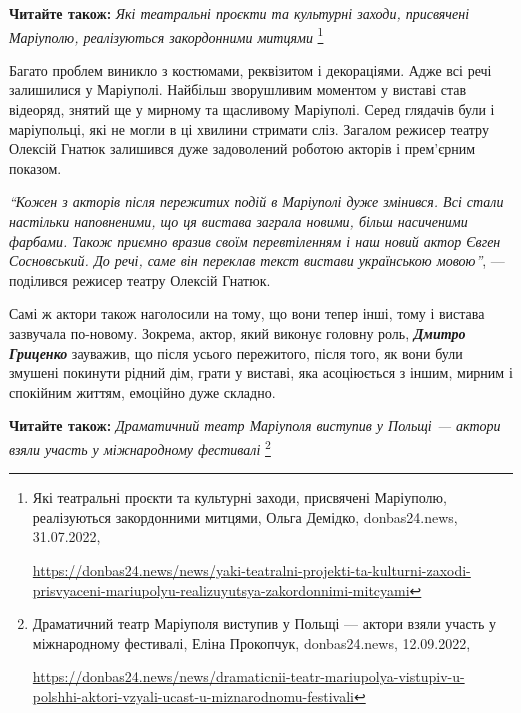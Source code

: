 \textbf{Читайте також:} \emph{Які театральні проєкти та культурні заходи, присвячені Маріуполю, реалізуються закордонними митцями}%
\footnote{Які театральні проєкти та культурні заходи, присвячені Маріуполю, реалізуються закордонними митцями, %
Ольга Демідко, donbas24.news, 31.07.2022, \par\url{https://donbas24.news/news/yaki-teatralni-projekti-ta-kulturni-zaxodi-prisvyaceni-mariupolyu-realizuyutsya-zakordonnimi-mitcyami}%
}


Багато проблем виникло з костюмами, реквізитом і декораціями. Адже всі речі
залишилися у Маріуполі. Найбільш зворушливим моментом у виставі став відеоряд,
знятий ще у мирному та щасливому Маріуполі. Серед глядачів були і маріупольці,
які не могли в ці хвилини стримати сліз. Загалом режисер театру Олексій Гнатюк
залишився дуже задоволений роботою акторів і прем'єрним показом. 

\begin{leftbar}
  \begingroup
\emph{\enquote{Кожен з акторів після пережитих подій в Маріуполі дуже змінився. Всі стали
настільки наповненими, що ця вистава заграла новими, більш насиченими
фарбами. Також приємно вразив своїм перевтіленням і наш новий актор
Євген Сосновський. До речі, саме він переклав текст вистави українською
мовою}}, — поділився режисер театру Олексій Гнатюк. 
   \endgroup
\end{leftbar}

Самі ж актори також наголосили на тому, що вони тепер інші, тому і вистава
зазвучала по-новому. Зокрема, актор, який виконує головну роль, \textbf{\emph{Дмитро Гриценко}}
зауважив, що після усього пережитого, після того, як вони були змушені покинути
рідний дім, грати у виставі, яка асоціюється з іншим, мирним і спокійним
життям, емоційно дуже складно.

\textbf{Читайте також:} \emph{Драматичний театр Маріуполя виступив у Польщі — актори взяли участь у міжнародному фестивалі}%
\footnote{Драматичний театр Маріуполя виступив у Польщі — актори взяли участь у міжнародному фестивалі, %
Еліна Прокопчук, donbas24.news, 12.09.2022, \par%
\url{https://donbas24.news/news/dramaticnii-teatr-mariupolya-vistupiv-u-polshhi-aktori-vzyali-ucast-u-miznarodnomu-festivali}%
}


